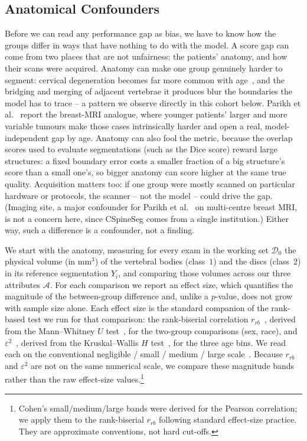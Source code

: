 \subsection{Anatomical Confounders}
\label{sec:confounders}

Before we can read any performance gap as bias, we have to know how the groups differ in
ways that have nothing to do with the model. A score gap can come from two places that
are not unfairness: the patients' anatomy, and how their scans were acquired. Anatomy can
make one group genuinely harder to segment: cervical degeneration becomes far more common
with age~\cite{kato2012cervical}, and the bridging and merging of adjacent vertebrae it
produces blur the boundaries the model has to trace -- a pattern we observe directly in
this cohort below. Parikh et al.~\cite{parikh2025labelbias} report the breast-MRI analogue,
where younger patients' larger and more variable tumours make those cases intrinsically
harder and open a real, model-independent gap by age. Anatomy can also fool the metric,
because the overlap scores used to
evaluate segmentations (such as the Dice score) reward large structures: a fixed boundary
error costs a smaller fraction of a big
structure's score than a small one's, so bigger anatomy can score higher at the same true
quality. Acquisition
matters too: if one group were mostly scanned on particular hardware
or protocols, the scanner -- not the model -- could drive the gap. (Imaging site, a major
confounder for Parikh et al.~\cite{parikh2025whofails} on multi-centre breast MRI, is not
a concern here, since CSpineSeg comes from a single institution.) Either way, such a
difference is a confounder, not a finding. 

We start with the anatomy, measuring for every exam in the working set $\mathcal{D}_0$ the physical volume (in
mm$^3$) of the vertebral bodies (class~$1$) and the discs (class~$2$) in its reference
segmentation $Y_i$, and comparing those volumes across our three attributes $\mathcal{A}$. For each comparison we report an effect size, which quantifies the
magnitude of the between-group difference and, unlike a $p$-value, does not grow with
sample size alone. Each effect size is the standard companion of the rank-based test we
run for that comparison: the rank-biserial correlation $r_{rb}$~\cite{wendt1972rankbiserial},
derived from the Mann--Whitney $U$ test~\cite{mann1947test}, for the two-group comparisons
(sex, race), and $\varepsilon^2$~\cite{tomczak2014effectsize}, derived from the
Kruskal--Wallis $H$ test~\cite{kruskal1952ranks}, for the three age bins. We read each on the
conventional negligible / small / medium / large scale~\cite{cohen1988power,tomczak2014effectsize}.
Because $r_{rb}$ and $\varepsilon^2$ are not on the same numerical scale, we compare these
magnitude bands rather than the raw effect-size values.\footnote{Cohen's small/medium/large
bands were derived for the Pearson correlation; we apply them to the rank-biserial $r_{rb}$
following standard effect-size practice. They are approximate conventions, not hard cut-offs.}

